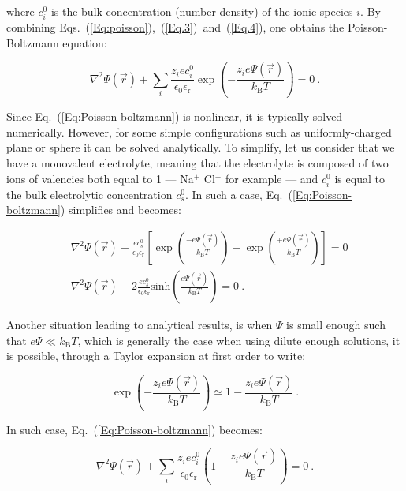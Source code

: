 where $c_i ^0$ is the bulk concentration (number density) of the ionic species $i$. By combining Eqs.~(\ref{Eq:poisson}),~(\ref{Eq.3})~and~(\ref{Eq.4}), one obtains the Poisson-Boltzmann equation:

\begin{equation}
	\nabla ^2 \Psi (\vec{r}) + \sum_i \frac{z_i e c_i^0}{\epsilon_0 \epsilon_\mathrm{r}} \exp \left( - \frac{z_i e \Psi (\vec{r})}{k_\mathrm{B}T} \right) = 0 ~.
	\label{Eq:Poisson-boltzmann}
\end{equation}

Since Eq.~(\ref{Eq:Poisson-boltzmann}) is nonlinear, it is typically solved numerically. However, for some simple configurations such as uniformly-charged plane or sphere it can be solved analytically. To simplify, let us consider that we have a monovalent electrolyte, meaning that the electrolyte is composed of two ions of valencies both equal to 1 --- Na$^+$ Cl$^-$ for example --- and $c_i ^0$ is equal to the bulk electrolytic concentration $c_s^0$. In such a case, Eq.~(\ref{Eq:Poisson-boltzmann}) simplifies and becomes:

\begin{equation}
	\begin{aligned}
		&\nabla ^2 \Psi (\vec{r}) + \frac{e c_s ^0}{\epsilon_0 \epsilon_\mathrm{r}} \left[ \exp \left( \frac{-e\Psi(\vec{r})}{k_\mathrm{B}T} \right) -  \exp \left( \frac{+e\Psi(\vec{r})}{k_\mathrm{B}T} \right) \right] = 0 \\
		&\nabla ^2 \Psi (\vec{r}) + 2 \frac{e c_s ^0}{\epsilon_0 \epsilon_\mathrm{r}} \mathrm{sinh}  \left( \frac{e\Psi(\vec{r})}{k_\mathrm{B}T} \right) = 0 ~.
	\end{aligned}
\end{equation}


Another situation leading to analytical results, is when $\Psi$ is small enough such that $e\Psi \ll k_\mathrm{B} T$, which is generally the case when using dilute enough solutions, it is possible, through a Taylor expansion at first order to write:

\begin{equation}
	\exp \left( - \frac{z_i e \Psi(\vec{r})}{k_\mathrm{B}T} \right) \simeq 1 - \frac{z_i e \Psi (\vec{r})}{k_\mathrm{B}T} ~.
\end{equation}

In such case, Eq.~(\ref{Eq:Poisson-boltzmann}) becomes:

\begin{equation}
	\nabla ^2 \Psi (\vec{r}) + \sum_i \frac{z_i e c_i^0}{\epsilon_0 \epsilon_\mathrm{r}}  \left( 1 - \frac{z_i e \Psi (\vec{r})}{k_\mathrm{B}T} \right)  = 0~.
	\label{Eq:poisson_b_3}
\end{equation}

